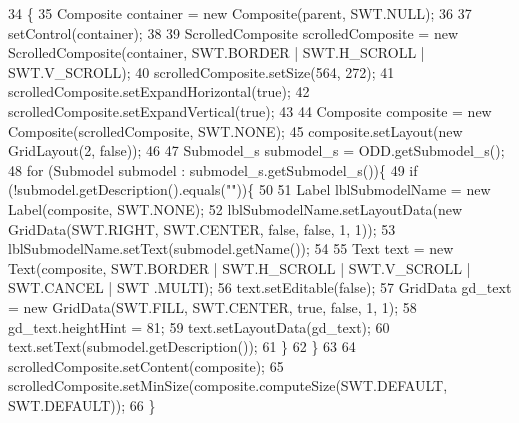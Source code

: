 \begin{DoxyCode}
34                                                 \{
35         Composite container = \textcolor{keyword}{new} Composite(parent, SWT.NULL);
36 
37         setControl(container);
38         
39         ScrolledComposite scrolledComposite = \textcolor{keyword}{new} ScrolledComposite(container, SWT.BORDER | SWT.H\_SCROLL | 
      SWT.V\_SCROLL);
40         scrolledComposite.setSize(564, 272);
41         scrolledComposite.setExpandHorizontal(\textcolor{keyword}{true});
42         scrolledComposite.setExpandVertical(\textcolor{keyword}{true});
43 
44         Composite composite = \textcolor{keyword}{new} Composite(scrolledComposite, SWT.NONE);
45         composite.setLayout(\textcolor{keyword}{new} GridLayout(2, \textcolor{keyword}{false}));
46         
47         Submodel\_s submodel\_s = ODD.getSubmodel\_s();
48         \textcolor{keywordflow}{for} (Submodel submodel : submodel\_s.getSubmodel\_s())\{
49             \textcolor{keywordflow}{if} (!submodel.getDescription().equals(\textcolor{stringliteral}{""}))\{
50                 
51                 Label lblSubmodelName = \textcolor{keyword}{new} Label(composite, SWT.NONE);
52                 lblSubmodelName.setLayoutData(\textcolor{keyword}{new} GridData(SWT.RIGHT, SWT.CENTER, \textcolor{keyword}{false}, \textcolor{keyword}{false}, 1, 1));
53                 lblSubmodelName.setText(submodel.getName());
54                 
55                 Text text = \textcolor{keyword}{new} Text(composite, SWT.BORDER | SWT.H\_SCROLL | SWT.V\_SCROLL | SWT.CANCEL | SWT
      .MULTI);
56                 text.setEditable(\textcolor{keyword}{false});
57                 GridData gd\_text = \textcolor{keyword}{new} GridData(SWT.FILL, SWT.CENTER, \textcolor{keyword}{true}, \textcolor{keyword}{false}, 1, 1);
58                 gd\_text.heightHint = 81;
59                 text.setLayoutData(gd\_text);
60                 text.setText(submodel.getDescription());
61             \}
62         \}
63         
64         scrolledComposite.setContent(composite);
65         scrolledComposite.setMinSize(composite.computeSize(SWT.DEFAULT, SWT.DEFAULT));
66     \}
\end{DoxyCode}
